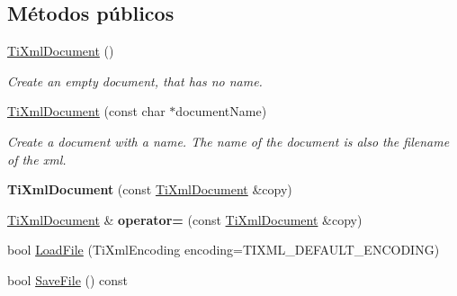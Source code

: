 \subsection*{\-Métodos públicos}
\begin{DoxyCompactItemize}
\item 
\hypertarget{classTiXmlDocument_a9f5e84335708fde98400230f9f12659c}{\hyperlink{classTiXmlDocument_a9f5e84335708fde98400230f9f12659c}{\-Ti\-Xml\-Document} ()}\label{classTiXmlDocument_a9f5e84335708fde98400230f9f12659c}

\begin{DoxyCompactList}\small\item\em \-Create an empty document, that has no name. \end{DoxyCompactList}\item 
\hypertarget{classTiXmlDocument_ae4508b452d0c3061db085f3db27b8396}{\hyperlink{classTiXmlDocument_ae4508b452d0c3061db085f3db27b8396}{\-Ti\-Xml\-Document} (const char $\ast$document\-Name)}\label{classTiXmlDocument_ae4508b452d0c3061db085f3db27b8396}

\begin{DoxyCompactList}\small\item\em \-Create a document with a name. \-The name of the document is also the filename of the xml. \end{DoxyCompactList}\item 
\hypertarget{classTiXmlDocument_a323a7486e7da6099cdc19a5ff7e74b07}{{\bfseries \-Ti\-Xml\-Document} (const \hyperlink{classTiXmlDocument}{\-Ti\-Xml\-Document} \&copy)}\label{classTiXmlDocument_a323a7486e7da6099cdc19a5ff7e74b07}

\item 
\hypertarget{classTiXmlDocument_aa56fd4dbe8917d2033d865909e2d737e}{\hyperlink{classTiXmlDocument}{\-Ti\-Xml\-Document} \& {\bfseries operator=} (const \hyperlink{classTiXmlDocument}{\-Ti\-Xml\-Document} \&copy)}\label{classTiXmlDocument_aa56fd4dbe8917d2033d865909e2d737e}

\item 
bool \hyperlink{classTiXmlDocument_a4c852a889c02cf251117fd1d9fe1845f}{\-Load\-File} (\-Ti\-Xml\-Encoding encoding=\-T\-I\-X\-M\-L\-\_\-\-D\-E\-F\-A\-U\-L\-T\-\_\-\-E\-N\-C\-O\-D\-I\-N\-G)
\item 
\hypertarget{classTiXmlDocument_a21c0aeb0d0a720169ad4ac89523ebe93}{bool \hyperlink{classTiXmlDocument_a21c0aeb0d0a720169ad4ac89523ebe93}{\-Save\-File} () const }\label{classTiXmlDocument_a21c0aeb0d0a720169ad4ac89523ebe93}


\end{DoxyCompactItemize}
